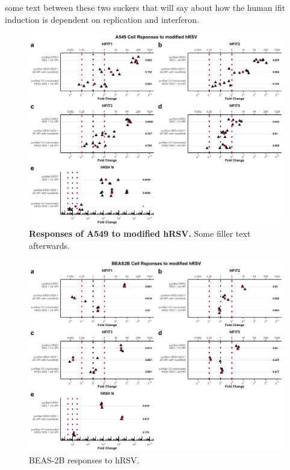 some text between these two suckers that will say about how the human ifit induction is dependent on replication and interferon.

\begin{figure}
    \centering
    \includegraphics[width=1\linewidth]{06. Chapter 1/Figs/01. Induction/06. a549_hrsv_uv_roxo.pdf}
    \caption[Responses of A549 to modified hRSV.]{\textbf{Responses of A549 to modified hRSV.} Some filler text afterwards.}
    \label{Responses of A549 to modified hRSV.}
\end{figure}

\begin{figure}
    \centering
    \includegraphics[width=1\linewidth]{06. Chapter 1/Figs/01. Induction/10. beas2b_hrsv.pdf}
    \caption[BEAS-2B responses to hRSV.]{BEAS-2B responses to hRSV.}
    \label{BEAS-2B responses to hRSV.}
\end{figure}



